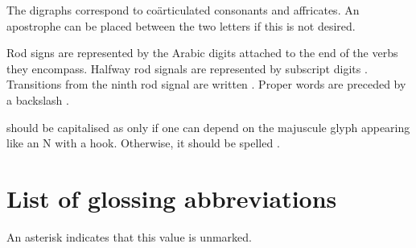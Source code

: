 \documentclass{book}
\begin{document}
The digraphs  correspond to coärticulated consonants and affricates. An apostrophe can be placed between the two letters if this is not desired.

Rod signs are represented by the Arabic digits  attached to the end of the verbs they encompass. Halfway rod signals are represented by subscript digits . Transitions from the ninth rod signal are written . Proper words are preceded by a backslash \ortho{\bs{}}.

 should be capitalised as  only if one can depend on the majuscule glyph appearing like an N with a hook. Otherwise, it should be spelled .

\chapter{List of glossing abbreviations}

An asterisk indicates that this value is unmarked.
\end{document}
